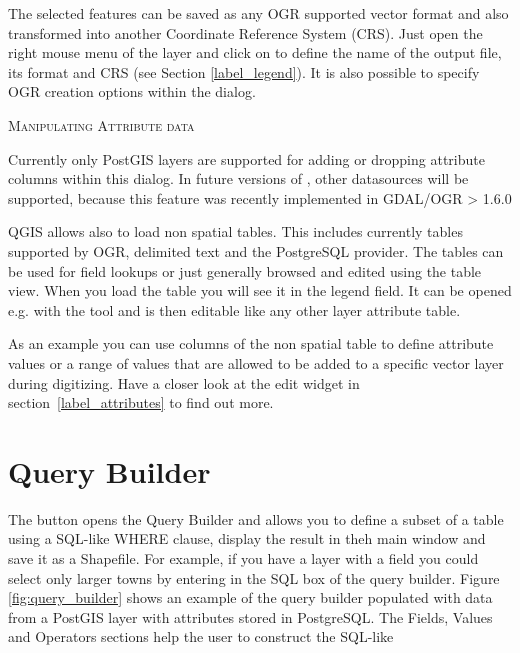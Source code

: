 
The selected features can be saved as any OGR supported vector format and also
transformed into another Coordinate Reference System (CRS). Just open the right mouse
menu of the layer and click on  to define the
name of the output file, its format and CRS (see Section \ref{label_legend}). It is 
also possible to specify OGR creation options within the dialog.

\begin{Tip}\caption{\textsc{Manipulating Attribute data}}
Currently only PostGIS layers are supported for adding or dropping
attribute columns within this dialog. In future versions of \qg, other
datasources will be supported, because this feature was recently implemented
in GDAL/OGR > 1.6.0
\end{Tip}


QGIS allows also to load non spatial tables. This includes currently tables supported 
by OGR, delimited text and the PostgreSQL provider. The tables can be used for field 
lookups or just generally browsed and edited using the table view. When you load the 
table you will see it in the legend field. It can be opened e.g. with the 
 tool and is then editable 
like any other layer attribute table. 

As an example you can use columns of the non spatial table to define attribute values or 
a range of values that are allowed to be added to a specific vector layer during digitizing. 
Have a closer look at the edit widget in section~\ref{label_attributes} to find out more.

\section{Query Builder}\label{sec:query_builder}

The  button opens the Query Builder and allows you to
define a subset of a table using a SQL-like WHERE clause, display the result in theh
main window and save it as a Shapefile. For example, if you have a
 layer
with a  field you could select only larger towns by entering
 in the SQL box of the query builder. Figure
\ref{fig:query_builder} shows an example of the query builder populated with
data from a PostGIS layer with attributes stored in PostgreSQL.
The Fields, Values and Operators sections help the user to construct the SQL-like

